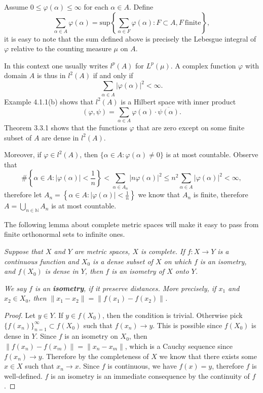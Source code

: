 Assume $0\le\varphi(\alpha)\le\infty$ for each $\alpha\in A$. Define 
$$
\sum_{\alpha \in A}{\varphi \left( \alpha \right)}=\mathrm{sup}\left\{ \sum_{\alpha \in F}{\varphi \left( \alpha \right)}:F\subset A,F\  \text{finite}\right\} ,
$$
it is easy to note that the sum defined above is precisely the Lebesgue integral of $\varphi$ relative to the counting measure $\mu$ on $A$.\par
In this context one usually writes $l^p(A)$ for $L^p(\mu)$. A complex function $\varphi$ with domain $A$ is thus in $l^2(A)$ if and only if 
$$\sum_{\alpha\in A}|\varphi(\alpha)|^2<\infty.$$
Example 4.1.1(b) shows that $l^2(A)$ is a Hilbert space with inner product 
$$
\left( \varphi ,\psi \right) =\sum_{\alpha \in A}{\varphi \left( \alpha \right) \cdot \overline{\psi \left( \alpha \right) }}.
$$
Theorem 3.3.1 shows that the functions $\varphi$ that are zero except on some finite subset of $A$ are dense in $l^2(A)$.\par
Moreover, if $\varphi\in l^2(A)$, then $\{\alpha\in A:\varphi(\alpha)\ne 0\}$ is at most countable. Observe that 
$$
\#\left\{ \alpha \in A:\left| \varphi \left( \alpha \right) \right|<\frac{1}{n} \right\} <\sum_{\alpha \in A_n}{\left| n\varphi \left( \alpha \right) \right|^2}\le n^2\sum_{\alpha \in A}{\left| \varphi \left( \alpha \right) \right|^2}<\infty ,
$$
therefore let $A_n=\left\{ \alpha \in A:\left| \varphi \left( \alpha \right) \right|<\frac{1}{n} \right\}$ we know that $A_n$ is finite, therefore $A=\bigcup_{n\in\mathbb{N}}A_n$ is at most countable.\par
The following lemma about complete metric spaces will make it easy to pass from finite orthonormal sets to infinite ones.
\begin{lemma}\em
Suppose that $X$ and $Y$ are metric spaces, $X$ is complete. If $f:X\to Y$ is a continuous function and $X_0$ is a dense subset of $X$ on which $f$ is an isometry, and $f(X_0)$ is dense in $Y$, then $f$ is an isometry of $X$ onto $Y$.
\end{lemma}
\begin{note}\em
We say $f$ is an \textbf{isometry}, if it preserve distances. More precisely, if $x_1$ and $x_2\in X_0$, then $\|x_1-x_2\|=\|f(x_1)-f(x_2)\|$.
\end{note}
\begin{proof}
Let $y\in Y$. If $y\in f(X_0)$, then the condition is trivial. Otherwise pick $\{f(x_n)\}_{n=1}^\infty\subset f(X_0)$ such that $f(x_n)\to y$. This is possible since $f(X_0)$ is dense in $Y$. Since $f$ is an isometry on $X_0$, then $\|f(x_n)-f(x_m)\|=\|x_n-x_m\|$, which is a Cauchy sequence since $f(x_n)\to y$. Therefore by the completeness of $X$ we know that there exists some $x\in X$ such that $x_n\to x$. Since $f$ is continuous, we have $f(x)=y$, therefore $f$ is well-defined. $f$ is an isometry is an immediate consequence by the continuity of $f$.
\end{proof}

